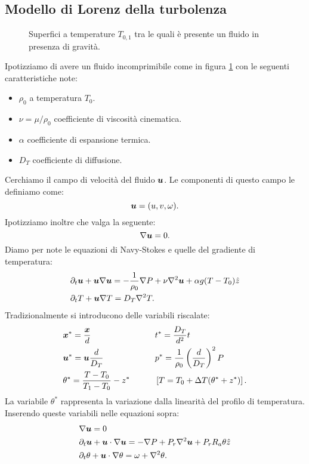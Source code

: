 \subsection{Modello di Lorenz della turbolenza}%
\label{sub:Modello di Lorenz della turbolenza}
\begin{figure}[H]
    \centering
    \caption{\scriptsize Superfici a temperature $T_{0,1}$ tra le quali è presente un fluido in presenza di gravità.}
    \label{fig:24_lorenz_turbo}
\end{figure}
Ipotizziamo di avere un fluido incomprimibile come in figura \ref{fig:24_lorenz_turbo} con le seguenti caratteristiche note:
\begin{itemize}
    \item $\rho_0$ a temperatura $T_0$.
    \item $\nu = \mu  /\rho_0$ coefficiente di viscosità cinematica.
    \item $\alpha$ coefficiente di espansione termica.
    \item $D_T$ coefficiente di diffusione.
\end{itemize}
Cerchiamo il campo di velocità del fluido $\boldsymbol{u}$. Le componenti di questo campo le definiamo come:
\[
    \boldsymbol{u}  = (u, v, \omega)
.\] 
Ipotizziamo inoltre che valga la seguente:
\[
    \nabla \boldsymbol{u} = 0
.\] 
Diamo per note le equazioni di Navy-Stokes e quelle del gradiente di temperatura:
\[\begin{aligned}
    &\partial_{t}\boldsymbol{u} + \boldsymbol{u}\nabla \boldsymbol{u}  = - \frac{1}{\rho_0}\nabla P + \nu\nabla ^2\boldsymbol{u} + \alpha g(T-T_0)\hat{z}\\
    & \partial_{t}T + \boldsymbol{u}\nabla T = D_T \nabla ^2T
.\end{aligned}\]
Tradizionalmente si introducono delle variabili riscalate:
\[\begin{aligned}
    &\boldsymbol{x}^* = \frac{\boldsymbol{x}}{d} && \qquad  t^* = \frac{D_T}{d^2}t\\
    & \boldsymbol{u}^* = \boldsymbol{u}  \frac{d}{D_T} && \qquad p^* = \frac{1}{\rho_0}\left(\frac{d}{D_T}\right)^2P\\
    & \theta^* = \frac{T-T_0}{T_1-T_0}-z^* && \qquad \left[T = T_0 + \Delta T(\theta^*+z^*)\right]
.\end{aligned}\]
La variabile $\theta^*$ rappresenta la variazione dalla linearità del profilo di temperatura.\\
Inserendo queste variabili nelle equazioni sopra:
\[\begin{aligned}
    & \nabla \boldsymbol{u}  = 0\\
    & \partial_{t}\boldsymbol{u}  + \boldsymbol{u}\cdot \nabla \boldsymbol{u} = - \nabla P + P_r \nabla ^2\boldsymbol{u} + P_rR_a \theta \hat{z}\\
    &\partial_{t}\theta + \boldsymbol{u}\cdot \nabla \theta = \omega + \nabla ^2\theta
.\end{aligned}\]
